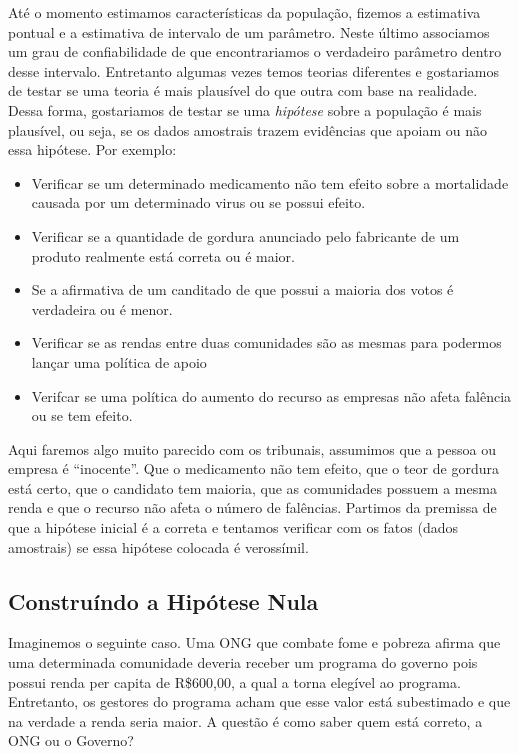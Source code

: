 \documentclass[
  letterpaper,
  DIV=11,
  numbers=noendperiod]{scrartcl}
\begin{document}
Até o momento estimamos características da população, fizemos a
estimativa pontual e a estimativa de intervalo de um parâmetro. Neste
último associamos um grau de confiabilidade de que encontrariamos o
verdadeiro parâmetro dentro desse intervalo. Entretanto algumas vezes
temos teorias diferentes e gostariamos de testar se uma teoria é mais
plausível do que outra com base na realidade. Dessa forma, gostariamos
de testar se uma \textit{hipótese} sobre a população é mais plausível,
ou seja, se os dados amostrais trazem evidências que apoiam ou não essa
hipótese. Por exemplo:

\begin{itemize}
\item Verificar se um determinado medicamento não tem efeito sobre a mortalidade causada por um determinado virus ou se possui efeito. 
\item Verificar se a quantidade de gordura anunciado pelo fabricante de um produto realmente está correta ou é maior. 
\item Se a afirmativa de um canditado de que possui a maioria dos votos é verdadeira ou é menor. 
\item Verificar se as rendas entre duas comunidades são as mesmas para podermos lançar uma política de apoio
\item Verifcar se uma política do aumento do recurso as empresas não afeta falência ou se tem efeito.
\end{itemize}

Aqui faremos algo muito parecido com os tribunais, assumimos que a
pessoa ou empresa é ``inocente''. Que o medicamento não tem efeito, que
o teor de gordura está certo, que o candidato tem maioria, que as
comunidades possuem a mesma renda e que o recurso não afeta o número de
falências. Partimos da premissa de que a hipótese inicial é a correta e
tentamos verificar com os fatos (dados amostrais) se essa hipótese
colocada é verossímil.

\subsection{Construíndo a Hipótese
Nula}\label{construuxedndo-a-hipuxf3tese-nula}

Imaginemos o seguinte caso. Uma ONG que combate fome e pobreza afirma
que uma determinada comunidade deveria receber um programa do governo
pois possui renda per capita de R\$600,00, a qual a torna elegível ao
programa. Entretanto, os gestores do programa acham que esse valor está
subestimado e que na verdade a renda seria maior. A questão é como saber
quem está correto, a ONG ou o Governo?
\end{document}
